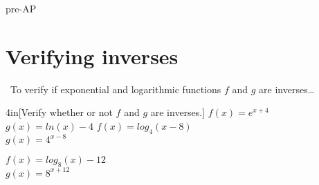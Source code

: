 \begin{taggedblock}{pre-AP}
    
\section{Verifying inverses}

\begin{myConceptSteps}{%
    ~To verify if exponential and logarithmic functions $f$ and $g$ are inverses\dots}
\end{myConceptSteps}

\begin{my2Problems}{4in}[Verify whether or not $f$ and $g$ are inverses.]
    {
        $f(x) = e^{x+4}$\\[0.25em]
        $g(x) = ln(x) - 4$
    }
    {
        $f(x) = log_4(x-8)$\\[0.25em]
        $g(x) = 4^{x-8}$
    }
\end{my2Problems}
\begin{myProblem}{4in}
    {
        $f(x) = log_8(x) - 12$\\[0.25em]
        $g(x) = 8^{x+12}$
    }
\end{myProblem}


\end{taggedblock}